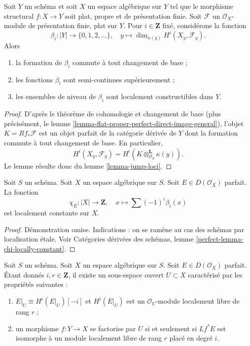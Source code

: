 \begin{lemma}
\label{lemma-jump-loci-geometric}
Soit $Y$ un sch\'ema et soit $X$ un espace alg\'ebrique sur $Y$ tel que le
morphisme structural $f:X\to Y$ soit plat, propre et de pr\'esentation finie.
Soit $\mathcal{F}$ un $\mathcal{O}_X$-module de pr\'esentation finie, plat sur
$Y$. Pour $i\in\mathbf{Z}$ fix\'e, consid\'erons la fonction
$$
\beta_i : |Y| \to \{0, 1, 2, \ldots\},\quad
y \longmapsto \dim_{\kappa(y)} H^i(X_y, \mathcal{F}_y).
$$
Alors
\begin{enumerate}
\item la formation de $\beta_i$ commute \`a tout changement de base ;
\item les fonctions $\beta_i$ sont semi-continues sup\'erieurement ;
\item les ensembles de niveau de $\beta_i$ sont localement constructibles
dans $Y$.
\end{enumerate}
\end{lemma}

\begin{proof}
D'apr\`es le th\'eor\`eme de cohomologie et changement de base (plus
pr\'ecis\'ement, le lemme
\ref{lemma-flat-proper-perfect-direct-image-general}), l'objet
$K=Rf_*\mathcal{F}$ est un objet parfait de la cat\'egorie d\'eriv\'ee de $Y$
dont la formation commute \`a tout changement de base. En particulier,
$$
H^i(X_y, \mathcal{F}_y) = H^i(K \otimes_{\mathcal{O}_Y}^\mathbf{L} \kappa(y)).
$$
Le lemme r\'esulte donc du lemme \ref{lemma-jump-loci}.
\end{proof}

\begin{lemma}
\label{lemma-chi-locally-constant}
Soit $S$ un sch\'ema. Soit $X$ un espace alg\'ebrique sur $S$.
Soit $E\in D(\mathcal{O}_X)$ parfait. La fonction
$$
\chi_E : |X| \longrightarrow \mathbf{Z},\quad
x \longmapsto \sum (-1)^i \beta_i(x)
$$
est localement constante sur $X$.
\end{lemma}

\begin{proof}
D\'emonstration omise. Indications :
on se ram\`ene au cas des sch\'emas par localisation \'etale. Voir Cat\'egories
d\'eriv\'ees des sch\'emas, lemme
\ref{perfect-lemma-chi-locally-constant}.
\end{proof}

\begin{lemma}
\label{lemma-open-where-cohomology-in-degree-i-rank-r}
Soit $S$ un sch\'ema. Soit $X$ un espace alg\'ebrique sur $S$.
Soit $E\in D(\mathcal{O}_X)$ parfait.
\'Etant donn\'es $i,r\in\mathbf{Z}$, il existe un sous-espace ouvert
$U\subset X$ caract\'eris\'e par les propri\'et\'es suivantes :
\begin{enumerate}
\item $E|_U\cong H^i(E|_U)[-i]$ et $H^i(E|_U)$ est un
$\mathcal{O}_U$-module localement libre de rang $r$ ;
\item un morphisme $f:Y\to X$ se factorise par $U$ si et seulement si
$Lf^*E$ est isomorphe \`a un module localement libre de rang $r$ plac\'e en
degr\'e $i$.
\end{enumerate}
\end{lemma}

